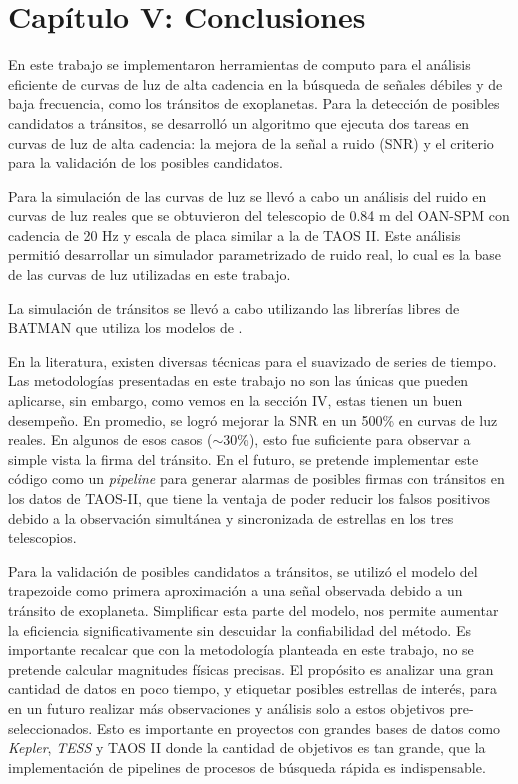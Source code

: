 \chapter*{\textbf{Capítulo V: Conclusiones}}
\label{ch:Conclusiones}
\setcounter{chapter}{5}
\setcounter{equation}{0}
\setcounter{figure}{0}
\setcounter{table}{0}

En este trabajo se implementaron herramientas de computo para el análisis eficiente de curvas de luz de alta cadencia en la búsqueda de señales débiles y de baja frecuencia, como los tránsitos de exoplanetas. Para la detección de posibles candidatos a tránsitos, se desarrolló un algoritmo que ejecuta dos tareas en curvas de luz de alta cadencia: la mejora de la señal a ruido (SNR) y el criterio para la validación de los posibles candidatos.

Para la simulación de las curvas de luz se llevó a cabo un análisis del ruido en curvas de luz reales que se obtuvieron del telescopio de 0.84 m del OAN-SPM con cadencia de 20 Hz y escala de placa similar a la de TAOS II. Este análisis permitió desarrollar un simulador parametrizado de ruido real, lo cual es la base de las curvas de luz utilizadas en este trabajo.

La simulación de tránsitos se llevó a cabo utilizando las librerías libres de BATMAN que utiliza los modelos de \citep{mandel2002analytic}.

En la literatura, existen diversas técnicas para el suavizado de series de tiempo. Las metodologías presentadas en este trabajo no son las únicas que pueden aplicarse, sin embargo, como vemos en la sección IV, estas tienen un buen desempeño. En promedio, se logró mejorar la SNR en un 500\% en curvas de luz reales. En algunos de esos casos ($\sim 30$\%), esto fue suficiente para observar a simple vista la firma del tránsito. En el futuro, se pretende implementar este código como un \textit{pipeline} para generar alarmas de posibles firmas con tránsitos en los datos de TAOS-II, que tiene la ventaja de poder reducir los falsos positivos debido a la observación simultánea y sincronizada de estrellas en los tres telescopios.

Para la validación de posibles candidatos a tránsitos, se utilizó el modelo del trapezoide como primera aproximación a una señal observada debido a un tránsito de exoplaneta. Simplificar esta parte del modelo, nos permite aumentar la eficiencia significativamente sin descuidar la confiabilidad del método. Es importante recalcar que con la metodología planteada en este trabajo, no se pretende calcular magnitudes físicas precisas. El propósito es analizar una gran cantidad de datos en poco tiempo, y etiquetar posibles estrellas de interés, para en un futuro realizar más observaciones y análisis solo a estos objetivos pre-seleccionados. Esto es importante en proyectos con grandes bases de datos como \textit{Kepler}, \textit{TESS} y TAOS II donde la cantidad de objetivos es tan grande, que la implementación de pipelines de procesos de búsqueda rápida es indispensable.


